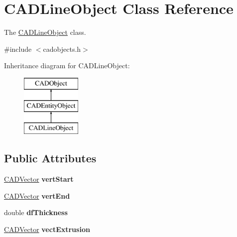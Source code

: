 \hypertarget{class_c_a_d_line_object}{}\section{C\+A\+D\+Line\+Object Class Reference}
\label{class_c_a_d_line_object}


The \hyperlink{class_c_a_d_line_object}{C\+A\+D\+Line\+Object} class.  




{\ttfamily \#include $<$cadobjects.\+h$>$}

Inheritance diagram for C\+A\+D\+Line\+Object\+:\begin{figure}[H]
\begin{center}
\leavevmode
\includegraphics[height=3.000000cm]{class_c_a_d_line_object}
\end{center}
\end{figure}
\subsection*{Public Attributes}
\begin{DoxyCompactItemize}
\item 
\hyperlink{class_c_a_d_vector}{C\+A\+D\+Vector} {\bfseries vert\+Start}\hypertarget{class_c_a_d_line_object_af1f180bebce94d1bfc90b9c0a055d0d8}{}\label{class_c_a_d_line_object_af1f180bebce94d1bfc90b9c0a055d0d8}

\item 
\hyperlink{class_c_a_d_vector}{C\+A\+D\+Vector} {\bfseries vert\+End}\hypertarget{class_c_a_d_line_object_ab2322d276ee0e0979f711f9535207f19}{}\label{class_c_a_d_line_object_ab2322d276ee0e0979f711f9535207f19}

\item 
double {\bfseries df\+Thickness}\hypertarget{class_c_a_d_line_object_aca2ad5351f37fd17a3a1edbddce74c0d}{}\label{class_c_a_d_line_object_aca2ad5351f37fd17a3a1edbddce74c0d}

\item 
\hyperlink{class_c_a_d_vector}{C\+A\+D\+Vector} {\bfseries vect\+Extrusion}\hypertarget{class_c_a_d_line_object_a738374670fd5efb2fea017146aece25b}{}\label{class_c_a_d_line_object_a738374670fd5efb2fea017146aece25b}

\end{DoxyCompactItemize}
